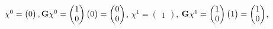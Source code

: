 $\chi^0 = \begin{pmatrix} 0 \end{pmatrix}, 
\mathbf{G} \chi^0 =  \begin{pmatrix} 1 \\ 0  \end{pmatrix} \begin{pmatrix} 0 \end{pmatrix} = \begin{pmatrix}  0 \\ 0 \end{pmatrix}$,
$\chi^1 = \begin{pmatrix} 1 \end{pmatrix} $, 
$ \mathbf{G} \chi^1 =  \begin{pmatrix} 1 \\ 0 \end{pmatrix} \begin{pmatrix} 1 \end{pmatrix} = \begin{pmatrix}  1 \\ 0 \end{pmatrix}$,

